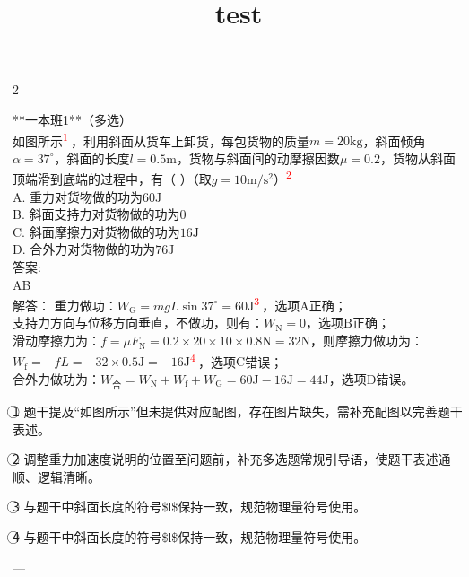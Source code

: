 \documentclass[12pt,a4paper]{ctexart}
\newlength{\colwidthinner}
\newcommand{\calccolwidth}{%
  \setlength{\colwidthinner}{\dimexpr\linewidth-2\fboxsep-2\fboxrule\relax}%
}
\newcommand{\correctionbox}[1]{%
  \calccolwidth
  \colorbox{blue!8}{\parbox{\colwidthinner}{#1}}%
}
\begin{document}
\title{test}
\author{}
\date{}
\maketitle

\begin{paracol}{2}

**一本班1**（多选）\\
如图所示\textsuperscript{\textcolor{red}{\textcircled{1}}}，利用斜面从货车上卸货，每包货物的质量$m=20\mathrm{kg}$，斜面倾角$\alpha ={37}^{\circ }$，斜面的长度$l=0.5\mathrm{m}$，货物与斜面间的动摩擦因数$\mu =0.2$，货物从斜面顶端滑到底端的过程中，有（ ）（取$g=10\mathrm{m}/{\mathrm{s}}^{2}$）\textsuperscript{\textcolor{red}{\textcircled{2}}}\\
A.                                  重力对货物做的功为$60\mathrm{J}$\\
B.                                  斜面支持力对货物做的功为$0$\\
C.                                  斜面摩擦力对货物做的功为$16\mathrm{J}$\\
D.                                  合外力对货物做的功为$76\mathrm{J}$\\
答案:\\
AB\\
解答：                             重力做功：${W}_{\mathrm G}=mgL\sin {37}^{\circ }=60\mathrm{J}$\textsuperscript{\textcolor{red}{\textcircled{3}}}，选项$\mathrm{A}$正确；\\
支持力方向与位移方向垂直，不做功，则有：${W}_{\mathrm N}=0$，选项$\mathrm{B}$正确；\\
滑动摩擦力为：$f=\mu {F}_{\mathrm{N}}=0.2\times 20\times 10\times 0.8\mathrm{N}=32\mathrm{N}$，则摩擦力做功为：${W}_{\mathrm{f}}=-fL=-32\times 0.5\mathrm{J}=-16\mathrm{J}$\textsuperscript{\textcolor{red}{\textcircled{4}}}，选项$\mathrm{C}$错误；\\
合外力做功为：${W}_{合}={W}_{\mathrm{N}}+{W}_{\mathrm{f}}+{W}_{\mathrm{G}}=60\mathrm{J}-16\mathrm{J}=44\mathrm{J}$，选项$\mathrm{D}$错误。\\

\switchcolumn

\correctionbox{\textcircled{1} 题干提及“如图所示”但未提供对应配图，存在图片缺失，需补充配图以完善题干表述。}
\medskip

\correctionbox{\textcircled{2} 调整重力加速度说明的位置至问题前，补充多选题常规引导语，使题干表述通顺、逻辑清晰。}
\medskip

\correctionbox{\textcircled{3} 与题干中斜面长度的符号\$l\$保持一致，规范物理量符号使用。}
\medskip

\correctionbox{\textcircled{4} 与题干中斜面长度的符号\$l\$保持一致，规范物理量符号使用。

---}
\medskip

\switchcolumn*

\end{paracol}
\end{document}
